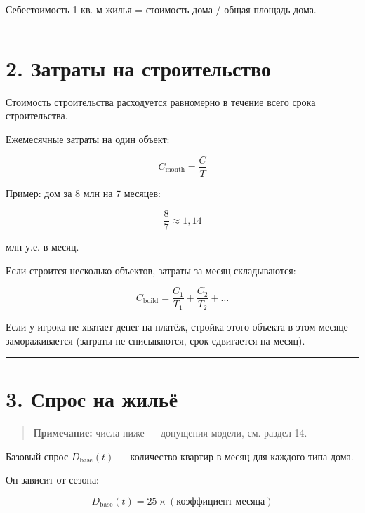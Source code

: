 \documentclass[
]{article}
\begin{document}
Себестоимость 1 кв. м жилья = стоимость дома / общая площадь дома.

\begin{center}\rule{0.5\linewidth}{0.5pt}\end{center}

\section{2. Затраты на
строительство}\label{ux437ux430ux442ux440ux430ux442ux44b-ux43dux430-ux441ux442ux440ux43eux438ux442ux435ux43bux44cux441ux442ux432ux43e}

Стоимость строительства расходуется равномерно в течение всего срока
строительства.

Ежемесячные затраты на один объект:

\[
C_{\text{month}} = \frac{C}{T}
\]

Пример: дом за 8 млн на 7 месяцев:

\[
\frac{8}{7} \approx 1{,}14
\]

млн у.е. в месяц.

Если строится несколько объектов, затраты за месяц складываются:

\[
C_{\text{build}}
=
\frac{C_1}{T_1}
+
\frac{C_2}{T_2}
+
\dots
\]

Если у игрока не хватает денег на платёж, стройка этого объекта в этом
месяце замораживается (затраты не списываются, срок сдвигается на
месяц).

\begin{center}\rule{0.5\linewidth}{0.5pt}\end{center}

\section{3. Спрос на
жильё}\label{ux441ux43fux440ux43eux441-ux43dux430-ux436ux438ux43bux44cux451}

\begin{quote}
\textbf{Примечание:} числа ниже --- допущения модели, см. раздел 14.
\end{quote}

Базовый спрос \(D_{\text{base}}(t)\) --- количество квартир в месяц для
каждого типа дома.

Он зависит от сезона:

\[
D_{\text{base}}(t)
=
25 \times (\text{коэффициент месяца})
\]
\end{document}
